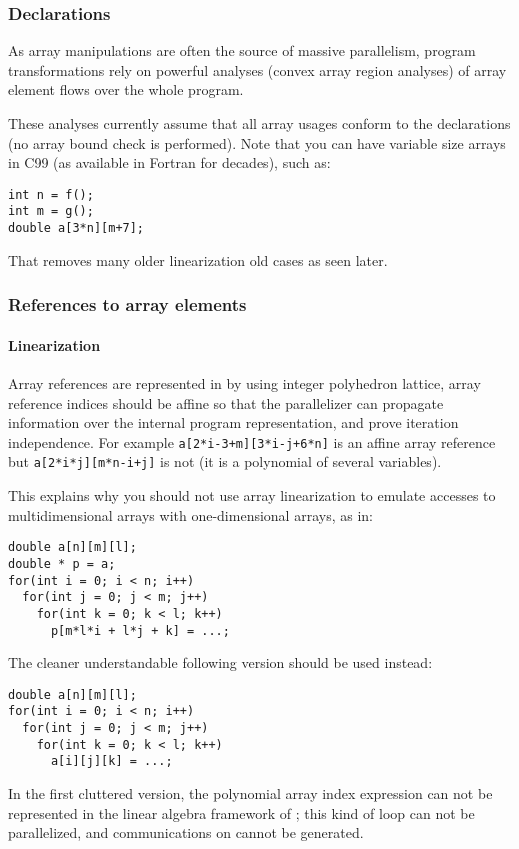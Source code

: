 \documentclass[a4paper]{article}
\begin{document}
\subsubsection{Declarations}
\label{sec:declarations}

As array manipulations are often the source of massive parallelism, \Apips
program transformations rely on powerful analyses (convex array region
analyses) of array element flows over the whole program.

These analyses currently assume that all array usages conform to the
declarations (no array bound check is performed). Note that you can have
variable size arrays in C99 (as available in Fortran for decades), such
as:
\begin{lstlisting}
int n = f();
int m = g();
double a[3*n][m+7];
\end{lstlisting}
That removes many older linearization old cases as seen later.


\subsubsection{References to array elements}
\label{sec:refer-array-elem}

\paragraph{Linearization}

Array references are represented in \Apips by using integer
polyhedron lattice, array reference indices should be affine so that
the parallelizer can propagate information over the internal program
representation, and prove iteration independence. For example
\lstinline|a[2*i-3+m][3*i-j+6*n]| is an affine array reference but
\lstinline|a[2*i*j][m*n-i+j]| is not (it is a polynomial of several
variables).

This explains why you should not use array linearization to emulate
accesses to multidimensional arrays with one-dimensional arrays, as in:
\begin{lstlisting}
double a[n][m][l];
double * p = a;
for(int i = 0; i < n; i++)
  for(int j = 0; j < m; j++)
    for(int k = 0; k < l; k++)
      p[m*l*i + l*j + k] = ...;
\end{lstlisting}
The cleaner understandable following version should be used instead:
\begin{lstlisting}
double a[n][m][l];
for(int i = 0; i < n; i++)
  for(int j = 0; j < m; j++)
    for(int k = 0; k < l; k++)
      a[i][j][k] = ...;
\end{lstlisting}
In the first cluttered version, the polynomial array index expression
can not be represented in the linear algebra framework of \Apips; this
kind of loop can not be parallelized, and communications on \Agpu
cannot be generated.
\end{document}
